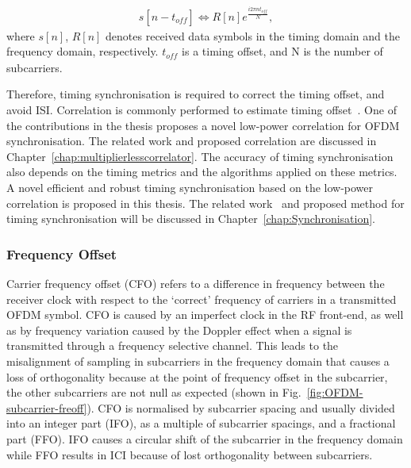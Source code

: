 \begin{eqnarray}
\label{equ:sto}
              s[n - t_{\mathit{off}}]  \Leftrightarrow R[n] e^{\frac{i2\pi n t_{\mathit{off}}}{N}},
\end{eqnarray}
where $s[n]$, $R[n]$ denotes received data symbols in the timing domain and the frequency domain, respectively. $t_{\mathit{off}}$ is a timing offset, and N is the number of subcarriers.

Therefore, timing synchronisation is required to correct the timing offset, and avoid ISI.
Correlation is commonly performed to estimate timing offset~\cite{Dick2003,Fort2003,Wang2004}. One of the contributions in the thesis proposes a novel low-power correlation for OFDM synchronisation. The related work and proposed correlation are discussed in Chapter~\ref{chap:multiplierlesscorrelator}.
The accuracy of timing synchronisation also depends on the timing metrics and the algorithms applied on these metrics. A novel efficient and robust timing synchronisation based on the low-power correlation is proposed in this thesis. The related work~\cite{Schmidl1997,Kishore2006,Guffey2007,Huang2010,Recio2010} and proposed method for timing synchronisation will be discussed in Chapter~\ref{chap:Synchronisation}.
\subsubsection{Frequency Offset}

Carrier frequency offset (CFO) refers to a difference in frequency between the receiver clock with respect to the `correct' frequency of carriers in a transmitted OFDM symbol.
CFO is caused by an imperfect clock in the RF front-end, as well as by frequency variation caused by the Doppler effect when a signal is transmitted through a frequency selective channel.
This leads to the misalignment of sampling in subcarriers in the frequency domain that causes a loss of orthogonality because at the point of frequency offset in the subcarrier, the other subcarriers are not null as expected (shown in Fig.~\ref{fig:OFDM-subcarrier-freoff}).
CFO is normalised by subcarrier spacing and usually divided into an integer part (IFO), as a multiple of subcarrier spacings, and a fractional part (FFO).
IFO causes a circular shift of the subcarrier in the frequency domain while FFO results in ICI because of lost orthogonality between subcarriers.

